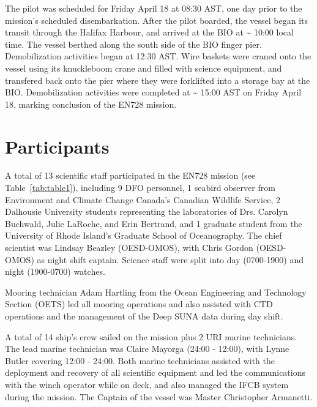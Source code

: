 \documentclass[12pt]{article}\usepackage[]{graphicx}\usepackage[]{color}
\begin{document}
The pilot was scheduled for Friday April 18 at 08:30 AST, one day prior to the mission's scheduled disembarkation. After the pilot boarded, the vessel began its transit through the Halifax Harbour, and arrived at the BIO at \textasciitilde{} 10:00 local time. The vessel berthed along the south side of the BIO finger pier. Demobilization activities began at 12:30 AST. Wire baskets were craned onto the vessel using its knuckleboom crane and filled with science equipment, and transfered back onto the pier where they were forklifted into a storage bay at the BIO. Demobilization activities were completed at \textasciitilde{} 15:00 AST on Friday April 18, marking conclusion of the EN728 mission.

\clearpage

\section{Participants}\label{sec:participants}

A total of 13 scientific staff participated in the EN728 mission (see Table~\ref{tab:table1}), including 9 DFO personnel, 1 seabird observer from Environment and Climate Change Canada's Canadian Wildlife Service, 2 Dalhousie University students representing the laboratories of Drs. Carolyn Buchwald, Julie LaRoche, and Erin Bertrand, and 1 graduate student from the University of Rhode Island's Graduate School of Oceanography. The chief scientist was Lindsay Beazley (OESD-OMOS), with Chris Gordon (OESD-OMOS) as night shift captain. Science staff were split into day (0700-1900) and night (1900-0700) watches.

Mooring technician Adam Hartling from the Ocean Engineering and Technology Section (OETS) led all mooring operations and also assisted with CTD operations and the management of the Deep SUNA data during day shift.

A total of 14 ship's crew sailed on the mission plus 2 URI marine technicians. The lead marine technician was Claire Mayorga (24:00 - 12:00), with Lynne Butler covering 12:00 - 24:00. Both marine technicians assisted with the deployment and recovery of all scientific equipment and led the communications with the winch operator while on deck, and also managed the IFCB system during the mission. The Captain of the vessel was Master Christopher Armanetti.
\end{document}
